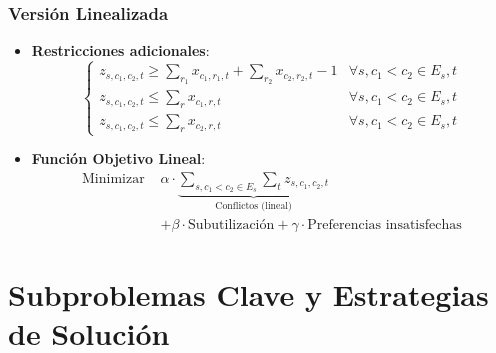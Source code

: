 \documentclass[12pt, a4paper]{article}
\begin{document}
\subsubsection{Versión Linealizada}
\begin{itemize}
    \item \textbf{Restricciones adicionales}:
    \[
    \begin{cases}
    z_{s, c_1, c_2, t} \geq \sum_{r_1} x_{c_1, r_1, t} + \sum_{r_2} x_{c_2, r_2, t} - 1 & \forall s, c_1 < c_2 \in E_s, t \\
    z_{s, c_1, c_2, t} \leq \sum_{r} x_{c_1, r, t} & \forall s, c_1 < c_2 \in E_s, t \\
    z_{s, c_1, c_2, t} \leq \sum_{r} x_{c_2, r, t} & \forall s, c_1 < c_2 \in E_s, t
    \end{cases}
    \]
    
    \item \textbf{Función Objetivo Lineal}:
    \[
    \begin{aligned}
    \text{Minimizar } & \alpha \cdot \underbrace{\sum_{s, c_1 < c_2 \in E_s} \sum_{t} z_{s, c_1, c_2, t}}_{\text{Conflictos (lineal)}} \\
    & + \beta \cdot \text{Subutilización} + \gamma \cdot \text{Preferencias insatisfechas}
    \end{aligned}
    \]
\end{itemize}

\section{Subproblemas Clave y Estrategias de Solución}
\end{document}
